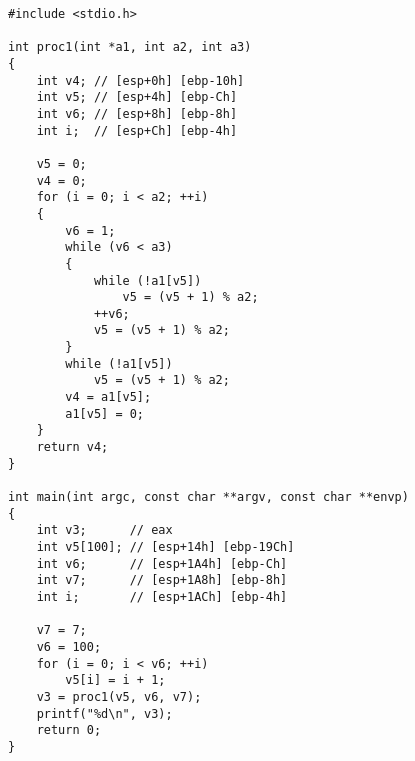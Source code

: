\documentclass[11pt]{article}
\begin{document}
\begin{lstlisting}[style=CStyle]
#include <stdio.h>

int proc1(int *a1, int a2, int a3)
{
    int v4; // [esp+0h] [ebp-10h]
    int v5; // [esp+4h] [ebp-Ch]
    int v6; // [esp+8h] [ebp-8h]
    int i;  // [esp+Ch] [ebp-4h]

    v5 = 0;
    v4 = 0;
    for (i = 0; i < a2; ++i)
    {
        v6 = 1;
        while (v6 < a3)
        {
            while (!a1[v5])
                v5 = (v5 + 1) % a2;
            ++v6;
            v5 = (v5 + 1) % a2;
        }
        while (!a1[v5])
            v5 = (v5 + 1) % a2;
        v4 = a1[v5];
        a1[v5] = 0;
    }
    return v4;
}

int main(int argc, const char **argv, const char **envp)
{
    int v3;      // eax
    int v5[100]; // [esp+14h] [ebp-19Ch]
    int v6;      // [esp+1A4h] [ebp-Ch]
    int v7;      // [esp+1A8h] [ebp-8h]
    int i;       // [esp+1ACh] [ebp-4h]

    v7 = 7;
    v6 = 100;
    for (i = 0; i < v6; ++i)
        v5[i] = i + 1;
    v3 = proc1(v5, v6, v7);
    printf("%d\n", v3);
    return 0;
}
\end{lstlisting}
\end{document}
